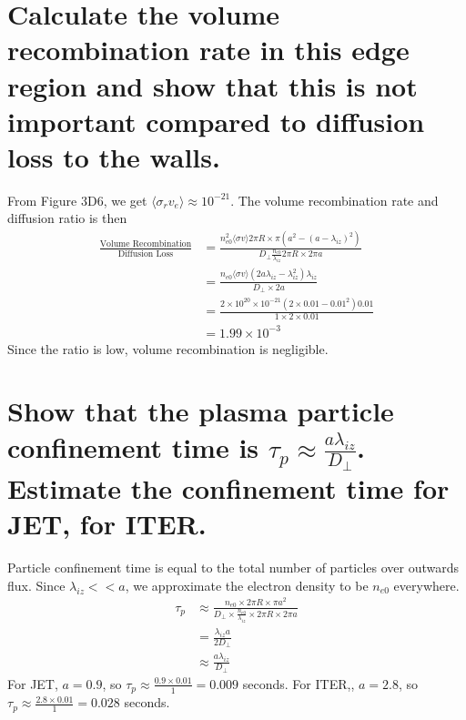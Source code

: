 \documentclass[answers]{exam}
\begin{document}
\begin{questions}
\begin{parts}

\part{Calculate the volume recombination rate in this edge region and show that this is not important compared to diffusion loss to the walls.}

\begin{solution}
    From Figure 3D6, we get $\langle \sigma_r v_e \rangle \approx 10^{-21}$. The volume recombination rate and diffusion ratio is then
    \begin{align*}
        \frac{\text{Volume Recombination}}{\text{Diffusion Loss}} &= \frac{n_{e0}^2 \langle \sigma v\rangle 2 \pi R \times \pi(a^2 - (a - \lambda_{iz})^2)}{D_\perp \frac{n_{e0}}{\lambda_{iz}}2\pi R \times 2\pi a} \\
                                                                  &= \frac{n_{e0}\langle \sigma v\rangle(2a\lambda_{iz} - \lambda_{iz}^2)\lambda_{iz}}{D_\perp \times 2a} \\
                                                                  &= \frac{2\times10^{20}\times10^{-21}(2\times0.01-0.01^2)0.01}{1 \times 2 \times 0.01} \\
                                                                  &= 1.99 \times 10^{-3}
    \end{align*}
    Since the ratio is low, volume recombination is negligible.
\end{solution}
    
\part{Show that the plasma particle confinement time is $\tau_p \approx \frac{a\lambda_{iz}}{D_\perp}$. Estimate the confinement time for JET, for ITER.}


\begin{solution}
    Particle confinement time is equal to the total number of particles over outwards flux. Since $\lambda_{iz} << a$, we approximate the electron density to be $n_{e0}$ everywhere.
    \begin{align*}
        \tau_p &\approx \frac{n_{e0} \times 2\pi R \times \pi a^2}{D_\perp \times \frac{n_{e0}}{\lambda_{iz}} \times 2\pi R \times 2\pi a} \\
               &= \frac{\lambda_{iz}a}{2D_\perp} \\
               &\approx \frac{a\lambda_{iz}}{D_\perp}
    \end{align*}
    For JET, $a = 0.9$, so $\tau_p \approx \frac{0.9 \times 0.01}{1} = 0.009$ seconds. For ITER,, $a = 2.8$, so $\tau_p \approx \frac{2.8 \times 0.01}{1} = 0.028$ seconds.
\end{solution}
\end{parts}
    


\end{questions}
\end{document}

